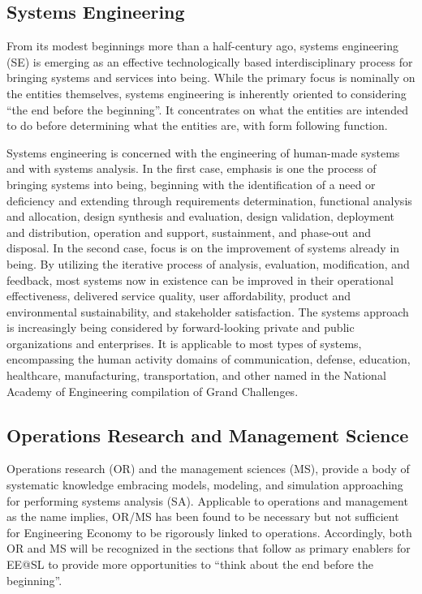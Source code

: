 \subsection{Systems Engineering}

From its modest beginnings more than a half-century ago, systems engineering (SE) is emerging as an effective technologically based interdisciplinary process for bringing systems and services into being. While the primary focus is nominally on the entities themselves, systems engineering is inherently oriented to considering “the end before the beginning”. It concentrates on what the entities are intended to do before determining what the entities are, with form following function.

Systems engineering is concerned with the engineering of human-made systems and with systems analysis. In the first case, emphasis is one the process of bringing systems into being, beginning with the identification of a need or deficiency and extending through requirements determination, functional analysis and allocation, design synthesis and evaluation, design validation, deployment and distribution, operation and support, sustainment, and phase-out and disposal. In the second case, focus is on the improvement of systems already in being. By utilizing the iterative process of analysis, evaluation, modification, and feedback, most systems now in existence can be improved in their operational effectiveness, delivered service quality, user affordability, product and environmental sustainability, and stakeholder satisfaction. The systems approach is increasingly being considered by forward-looking private and public organizations and enterprises. It is applicable to most types of systems, encompassing the human activity domains of communication, defense, education, healthcare, manufacturing, transportation, and other named in the National Academy of Engineering compilation of Grand Challenges.

\subsection{Operations Research and Management Science}

Operations research (OR) and the management sciences (MS), provide a body of systematic knowledge embracing models, modeling, and simulation approaching for performing systems analysis (SA). Applicable to operations and management as the name implies, OR/MS has been found to be necessary but not sufficient for Engineering Economy to be rigorously linked to operations. Accordingly, both OR and MS will be recognized in the sections that follow as primary enablers for EE@SL to provide more opportunities to “think about the end before the beginning”.

